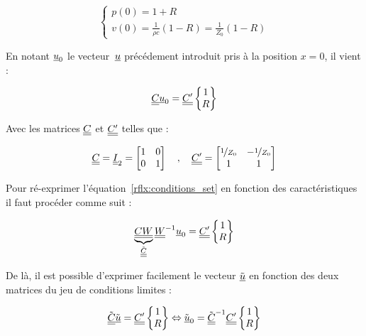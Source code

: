 \begin{equation}
	\left\{\begin{array}{l}
		p(0) = 1 + R\\
		v(0) = \frac{1}{\rho c}(1-R) = \frac{1}{Z_0}(1-R)
	\end{array}\right.\label{rflx:BC0}
\end{equation}

En notant $\underline{u}_0$ le vecteur~$\underline{u}$ précédement introduit pris à la position $x=0$, il vient :

\begin{equation}
	\underline{\underline{C}}\underline{u}_0 = \underline{\underline{C'}}\begin{Bmatrix}1\\R\end{Bmatrix} \label{rflx:conditions_set}
\end{equation}

Avec les matrices $\underline{\underline{C}}$ et $\underline{\underline{C'}}$ telles que :

\begin{equation*}
	\underline{\underline{C}} = \underline{\underline{I}}_2 = \begin{bmatrix}1&0\\0&1\end{bmatrix} \quad,\quad
	\underline{\underline{C'}} = \begin{bmatrix}\nicefrac{1}{Z_0} & -\nicefrac{1}{Z_0}\\ 1 & 1\end{bmatrix}
\end{equation*}

Pour ré-exprimer l'équation~\eqref{rflx:conditions_set} en fonction des caractéristiques il faut procéder comme suit :

\begin{equation*}
\underbrace{\underline{\underline{C}}\underline{\underline{W}}}_{\tilde{\underline{\underline{C}}}}\underline{\underline{W}}^{-1}\underline{u}_0 = \underline{\underline{C'}}\begin{Bmatrix}1\\R\end{Bmatrix}
\end{equation*}

De là, il est possible d'exprimer facilement le vecteur $\tilde{\underline{u}}$ en fonction des deux matrices du jeu de conditions
limites :

\begin{equation*}
\tilde{\underline{\underline{C}}}\tilde{\underline{u}} = \underline{\underline{C'}}\begin{Bmatrix}1\\R\end{Bmatrix} \Leftrightarrow \tilde{\underline{u}}_0 = \tilde{\underline{\underline{C}}}^{-1}\underline{\underline{C'}}\begin{Bmatrix}1\\R\end{Bmatrix}
\end{equation*}


